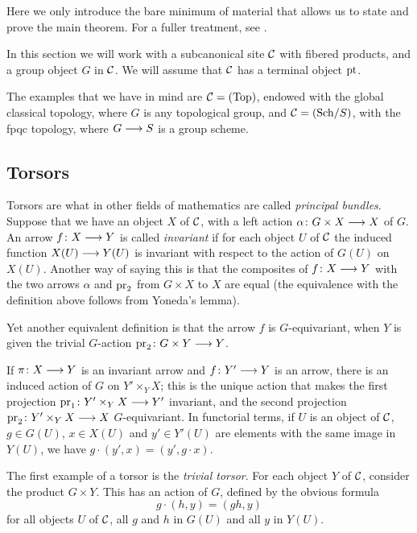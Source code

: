 \begin{4   STACKS}
\begin{4.4 Descent along torsors}
Here we only introduce the bare minimum of material that allows us to state and prove the main theorem. For a fuller treatment, see \cite{demazure-gabriel}.

In this section we will work with a subcanonical site $\mathcal{C}$ with fibered products, and a group object $G$ in $\mathcal{C}$. We will assume that $\mathcal{C}$ has a terminal object $\mathrm{pt}$.

The examples that we have in mind are $\mathcal{C} = (\mathrm{Top})$, endowed with the global classical topology, where $G$ is any topological group, and $\mathcal{C} = ({\mathrm{Sch}/S})$, with the fpqc topology, where $G \arr S$ is a group scheme.


\subsection{Torsors}

Torsors are what in other fields of mathematics are called \emph{principal bundles}. Suppose that we have an object $X$ of $\mathcal{C}$, with a left action $\alpha \colon G \times X \arr X$ of $G$. An arrow $f\colon X \arr Y$ is called \emph{invariant}%
%
 if for each object $U$ of $\mathcal{C}$ the induced function $X(U) \arr Y(U)$ is invariant with respect to the action of $G(U)$ on $X(U)$. Another way of saying this is that the composites of $f\colon X \arr Y$ with the two arrows $\alpha$ and $\operatorname{pr}_2$ from $G \times X$ to $X$ are equal (the equivalence with the definition above follows from Yoneda's lemma).

Yet another equivalent definition is that the arrow $f$ is $G$-equivariant, when $Y$ is given the trivial $G$-action $\pr_2 \colon G \times Y \arr Y$.

If $\pi \colon X \arr Y$ is an invariant arrow and $f \colon Y' \arr Y$ is an arrow, there is an induced action of $G$ on $Y' \times_{Y} X$; this is the unique action that makes the first projection $\pr_1 \colon Y' \times_{Y} X \arr Y'$ invariant, and the second projection $\pr_2 \colon Y' \times_{Y} X \arr X$ $G$-equivariant. In functorial terms, if $U$ is an object of $\mathcal{C}$, $g \in G(U)$, $x \in X(U)$ and $y' \in Y'(U)$ are elements with the same image in $Y(U)$, we have $g \cdot (y', x) = (y', g \cdot x)$.

The first example of a torsor is the \emph{trivial torsor}. For each object $Y$ of $\mathcal{C}$, consider the product $G \times Y$. This has an action of $G$, defined by the obvious formula
   \[
   g \cdot (h, y) = (gh,y)
   \]
for all objects $U$ of $\mathcal{C}$, all $g$ and $h$ in $G(U)$ and all $y$ in $Y(U)$.


\end{4.4 Descent along torsors}
\end{4   STACKS}
